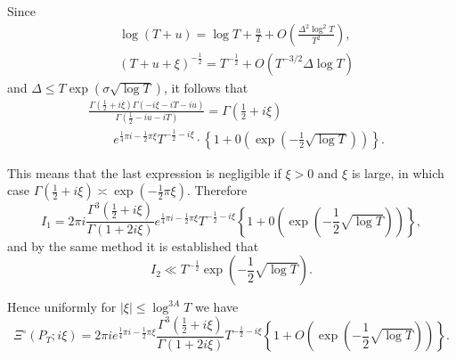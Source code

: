 Since 
\begin{align*}
& \log (T + u) = \log T + \frac{u}{T} + O \left(\frac{\Delta^2 \log^2
    T}{T^2} \right), \\ 
& (T + u + \xi)^{-\frac{1}{2}} = T^{-\frac{1}{2}} + O (T^{-3/2}\Delta
  \log T) 
\end{align*}
and $\Delta \leq T \exp (\sigma \sqrt{\log T})$, it follows that 
\begin{align*}
& \frac{\Gamma (\frac{1}{2} + i \xi ) \Gamma (-i\xi - iT - iu)}{\Gamma
    (\frac{1}{2} - i u - iT)} = \Gamma \left(\frac{1}{2} + i \xi
  \right) \\ 
& \qquad e^{\frac{1}{4} \pi i - \frac{1}{2} \pi \xi}  T^{-\frac{1}{2}
    - i \xi} \cdot \left\{1+ 0 \left(\exp \left(-\frac{1}{2}
  \sqrt{\log T} \right) \right) \right\}. 
\end{align*}

This means that the last expression is negligible if $\xi > 0$ and
$\xi$ is large, in which case $\Gamma (\frac{1}{2} + i \xi) \asymp
\exp (-\frac{1}{2} \pi\xi)$. Therefore 
$$ 
I_1 = 2 \pi i \frac{\Gamma^3 (\frac{1}{2} + i \xi)}{\Gamma (1+ 2 i
  \xi)} e^{\frac{1}{4} \pi i - \frac{1}{2} \pi \xi} T^{-\frac{1}{2} -
  i \xi} \left\{ 1+ 0 \left(\exp \left(-\frac{1}{2} \sqrt{\log T}
\right) \right)\right\}, 
$$
and by the same method it is established that
$$
I_2 \ll T^{-\frac{1}{2}} \exp \left(-\frac{1}{2} \sqrt{\log T} \right). 
$$

Hence uniformly for $|\xi| \leq \log^{3A} T$ we have
{\fontsize{9pt}{11pt}\selectfont
\begin{equation}
\Xi^\circ (P_T; i \xi) = 2 \pi ie^{\frac{1}{4} \pi i - \frac{1}{2} \pi
  \xi} \frac{\Gamma^3 (\frac{1}{2} + i \xi)}{ \Gamma (1+ 2 i \xi)}
T^{-\frac{1}{2} - i \xi} \left\{1+ O \left(\exp \left(-\frac{1}{2}
\sqrt{\log T} \right) \right)\right\}. 
\label{c5:eq5.136}
\end{equation}}

